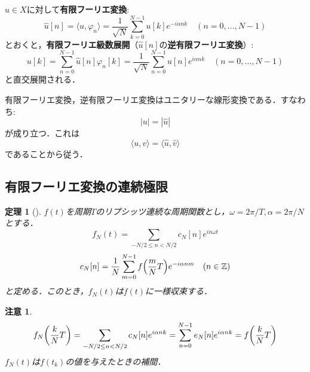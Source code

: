 \documentclass[dvipdfmx,a4j,10pt]{jsarticle}
\theoremstyle{mystyle1}
\newtheorem{theorem}{定理}[section]
\theoremstyle{mystyle3}
\theoremstyle{mystyle4}
\newtheorem{note}{注意}[section]
\theoremstyle{mystyle6}
\theoremstyle{mystyle2}
\theoremstyle{mystyle5}
\newenvironment{thm}[1][]
{\begin{tcolorbox}[
    enhanced,
    boxrule=0pt,
    arc=0mm,
    frame hidden,
    borderline west={2pt}{-4pt}{red},
    breakable = true
    ]
    \begin{theorem}[#1]
}
{\end{theorem}\end{tcolorbox}}
\begin{document}
$u\in X$に対して\textbf{有限フーリエ変換}:
\begin{equation}\label{eq:1-12}
	\hat u[n]=\langle u,\varphi_n \rangle=\frac{1}{\sqrt{N}}\sum_{k=0}^{N-1}u[k]e^{-i\alpha nk}\quad(n=0,\ldots,N-1)
\end{equation}
とおくと，\textbf{有限フーリエ級数展開}（$\hat u[n]$の\textbf{逆有限フーリエ変換}）:
\begin{equation}\label{eq:1-13}
	u[k]=\sum_{n=0}^{N-1}\hat u[n]\varphi_n[k]=\frac{1}{\sqrt{N}}\sum_{n=0}^{N-1}\hat u[n]e^{i\alpha nk}\quad(n=0,\ldots,N-1)
\end{equation}
と直交展開される．

有限フーリエ変換，逆有限フーリエ変換はユニタリーな線形変換である．すなわち:
\begin{equation}\label{eq:1-14}
	|u|=|\hat u|
\end{equation}
が成り立つ．これは
\begin{equation}\label{eq:1-15}
	\langle u,v\rangle=\langle \hat u,\hat v\rangle
\end{equation}
であることから従う．

\subsection{有限フーリエ変換の連続極限}

\begin{thm}\label{thm:1-5}
	$f(t)$を周期$T$のリプシッツ連続な周期関数とし，$\omega=2\pi/T, \alpha=2\pi/N$とする．
	\[
		f_N(t)=\sum_{-N/2\leq n<N/2} c_N[n]e^{in\omega t}
	\]
	\[
		c_N[n]=\frac{1}{N}\sum_{m=0}^{N-1}f\mleft(\frac{m}{N}T\mright)e^{-i\alpha nm}\quad(n\in\mathbb{Z})
	\]
	と定める．このとき，$f_N(t)$は$f(t)$に一様収束する．
\end{thm}

\begin{note}\label{note:1-1}
	\[
		f_N\mleft(\frac{k}{N}T\mright)=\sum_{-N/2\leq n<N/2} c_N[n]e^{i\alpha nk}=\sum_{n=0}^{N-1}e_N[n]e^{i\alpha nk}=f\mleft(\frac{k}{N}T\mright)
	\]
	$f_N(t)$は$f(t_k)$の値を与えたときの補間．
\end{note}
\end{document}
